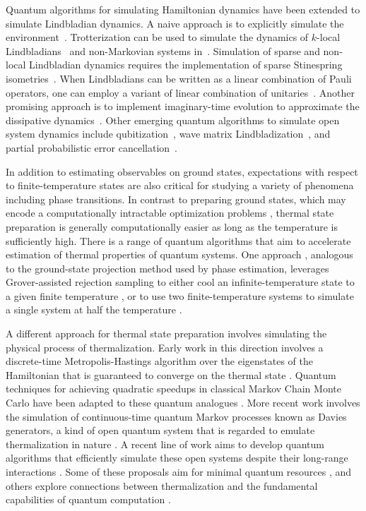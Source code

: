 Quantum algorithms for simulating Hamiltonian dynamics have been extended to simulate Lindbladian dynamics. A naive approach is to explicitly simulate the environment~\cite{wang2011quantum, kliesch2011dissipative,ding2023simulating}. Trotterization can be used to simulate the dynamics of $k$-local Lindbladians~\cite{kliesch2011dissipative} and non-Markovian systems in~\cite{sweke2016digital}. Simulation of sparse and non-local Lindbladian dynamics requires the implementation of sparse
Stinespring isometries~\cite{childs2016efficient}. When Lindbladians can be written as a linear combination of Pauli operators, one can employ a variant of linear combination of unitaries~\cite{cleve2016efficient}. Another promising approach is to implement imaginary-time evolution to approximate the dissipative dynamics~\cite{kamakari2022digital}. Other emerging quantum algorithms to simulate open system dynamics include qubitization~\cite{pocrnic2023quantum}, wave matrix Lindbladization~\cite{patel2023wave,patel2023wave2}, and partial probabilistic error cancellation~\cite{guimaraes2023noise}. 

In addition to estimating observables on ground states, expectations with respect to finite-temperature states are also critical for studying a variety of phenomena including phase transitions. In contrast to preparing ground states, which may encode a computationally intractable optimization problems \cite{kempekitaevregev04}, thermal state preparation is generally computationally easier as long as the temperature is sufficiently high.
There is a range of quantum algorithms that aim to accelerate estimation of thermal properties of quantum systems. One approach \cite{poulinwocjan09}, analogous to the ground-state projection method used by phase estimation, leverages Grover-assisted rejection sampling to either cool an infinite-temperature state to a given finite temperature \cite{chowdhurysomma16}, or to use two finite-temperature systems to simulate a single system at half the temperature \cite{cotler18}. 

A different approach for thermal state preparation involves simulating the physical process of thermalization. Early work in this direction involves a discrete-time Metropolis-Hastings algorithm over the eigenstates of the Hamiltonian that is guaranteed to converge on the thermal state \cite{temme09}. Quantum techniques for achieving quadratic speedups in classical Markov Chain Monte Carlo have been adapted to these quantum analogues \cite{yungguzik10, wocjantemme21}. More recent work involves the simulation of continuous-time quantum Markov processes known as Davies generators, a kind of open quantum system that is regarded to emulate thermalization in nature \cite{davies76}. A recent line of work aims to develop quantum algorithms that efficiently simulate these open systems despite their long-range interactions \cite{rallwangwocjan21, chenkastoryanobrandaogilyen23, chenkastoryanogilyen23}. Some of these proposals aim for minimal quantum resources \cite{dingchenlin23}, and others explore connections between thermalization and the fundamental capabilities of quantum computation \cite{chenhuangpreskillzhou23}.

